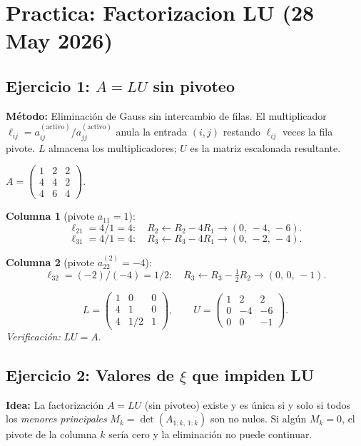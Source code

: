 \documentclass[11pt,a4paper]{article}
\begin{document}
\section{Practica: Factorizacion LU (28 May 2026)}

\subsection{Ejercicio 1: $A=LU$ sin pivoteo}
\label{sec:practica_lu_1}

\textbf{Método:} Eliminación de Gauss sin intercambio de filas. El multiplicador $\ell_{ij} = a_{ij}^{(\text{activo})}/a_{jj}^{(\text{activo})}$ anula la entrada $(i,j)$ restando $\ell_{ij}$ veces la fila pivote. $L$ almacena los multiplicadores; $U$ es la matriz escalonada resultante.

$A = \begin{pmatrix}1&2&2\\4&4&2\\4&6&4\end{pmatrix}$.

\textbf{Columna 1} (pivote $a_{11}=1$):
\[
  \ell_{21} = 4/1 = 4: \quad R_2 \leftarrow R_2 - 4R_1 \to (0,\,-4,\,-6).
\]
\[
  \ell_{31} = 4/1 = 4: \quad R_3 \leftarrow R_3 - 4R_1 \to (0,\,-2,\,-4).
\]

\textbf{Columna 2} (pivote $a_{22}^{(2)}=-4$):
\[
  \ell_{32} = (-2)/(-4) = 1/2: \quad R_3 \leftarrow R_3 - \tfrac{1}{2}R_2 \to (0,\,0,\,-1).
\]

\[
  L = \begin{pmatrix}1&0&0\\4&1&0\\4&1/2&1\end{pmatrix}, \qquad
  U = \begin{pmatrix}1&2&2\\0&-4&-6\\0&0&-1\end{pmatrix}.
\]
\textit{Verificación:} $LU = A$. \checkmark

\subsection{Ejercicio 2: Valores de $\xi$ que impiden LU}
\label{sec:practica_lu_2}

\textbf{Idea:} La factorización $A=LU$ (sin pivoteo) existe y es única si y solo si todos los \emph{menores principales} $M_k = \det(A_{1:k,\,1:k})$ son no nulos. Si algún $M_k=0$, el pivote de la columna $k$ sería cero y la eliminación no puede continuar.
\end{document}
